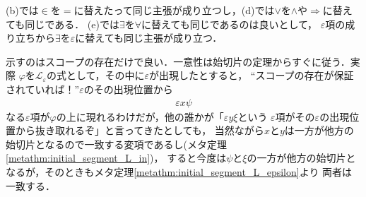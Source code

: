 	(b)では$\in$を$=$に替えたって同じ主張が成り立つし，(d)では$\vee$を$\wedge$や$\Longrightarrow$に替えても同じである．
	(e)では$\exists$を$\forall$に替えても同じであるのは良いとして，
	$\varepsilon$項の成り立ちから$\exists$を$\varepsilon$に替えても同じ主張が成り立つ．
	
	示すのはスコープの存在だけで良い．一意性は始切片の定理からすぐに従う．実際
	$\varphi$を$\mathcal{L}_{\varepsilon}$の式として，その中に$\varepsilon$が出現したとすると，
	``スコープの存在が保証されていれば！''$\varepsilon$のその出現位置から
	\begin{align}
		\varepsilon x \psi
	\end{align}
	なる$\varepsilon$項が$\varphi$の上に現れるわけだが，他の誰かが「$\varepsilon y \xi$という
	$\varepsilon$項がその$\varepsilon$の出現位置から抜き取れるぞ」と言ってきたとしても，
	当然ながら$x$と$y$は一方が他方の始切片となるので一致する変項であるし(メタ定理\ref{metathm:initial_segment_L_in})，
	すると今度は$\psi$と$\xi$の一方が他方の始切片となるが，そのときもメタ定理\ref{metathm:initial_segment_L_epsilon}より
	両者は一致する．
	
